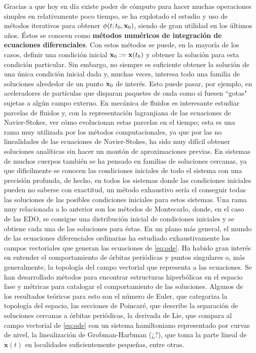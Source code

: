 Gracias a que hoy en día existe poder de cómputo para hacer muchas operaciones simples en relativamente poco tiempo, se ha explotado el estudio y uso de métodos iterativos para obtener $\phi(t;t_0,\mathbf{x}_0)$, siendo de gran utilidad en los últimos años. Éstos se conocen como \textbf{métodos numéricos de integración de ecuaciones diferenciales}. Con estos métodos se puede, en la mayoría de los casos, definir una condición inicial $\mathbf{x}_0 := \mathbf{x}(t_0)$ y obtener la solución para esta condición particular. Sin embargo, no siempre es suficiente obtener la solución de una única condición inicial dada y, muchas veces, interesa todo una familia de soluciones alrededor de un punto $\mathbf{x}_0$ de interés. Esto puede pasar, por ejemplo, en aceleradores de partículas que disparan paquetes de onda como si fuesen ``gotas" sujetas a algún campo externo. En mecánica de fluidos es interesante estudiar parcelas de fluidos y, con la representación lagranjiana de las ecuaciones de Navier-Stokes, ver cómo evolucionan estas parcelas en el tiempo; esta es una rama muy utilizada por los métodos computacionales, ya que por las no linealidades de las ecuaciones de Navier-Stokes, ha sido muy difícil obtener soluciones analíticas sin hacer un montón de aproximaciones previas. En sistemas de muchos cuerpos también se ha pensado en familias de soluciones cercanas, ya que dificilmente se conocen las condiciones iniciales de todo el sistema con una precisión profunda, de hecho, en todos los sistemas donde las condiciones iniciales pueden no saberse con exactitud, un método exhaustivo sería el conseguir todas las soluciones de las posibles condiciones iniciales para estos sistemas. Una rama muy relacionada a lo anterior son los métodos de Montecarlo, donde, en el caso de las EDO, se consigue una distribución inicial de condiciones iniciales y se obtiene cada una de las soluciones para éstas. 
En un plano más general, el mundo de las ecuaciones diferenciales ordinarias ha estudiado exhaustivamente los campos vectoriales que generan las ecuaciones de \ref{eq:ode}. Ha habido gran interés en entender el comportamiento de órbitas periódicas y puntos singulares o, más generalmente, la topología del campo vectorial que representa a las ecuaciones. Se han desarrollado métodos para encontrar estructuras hiperbólicas en el espacio fase y métricas para catalogar el comportamiento de las soluciones. Algunos de los resultados teóricos para esto son el número de Euler, que categoriza la topología del espacio, las secciones de Poincaré, que describe la separación de soluciones cercanas a órbitas periódicas, la derivada de Lie, que compara al campo vectorial de \ref{eq:ode} con un sistema hamiltoniano representado por curvas de nivel, la linealización de Grobman-Harbman (¿?), que toma la parte lineal de $\dot{\mathbf{x}}(t)$ en localidades suficientemente pequeñas, entre otras. 

